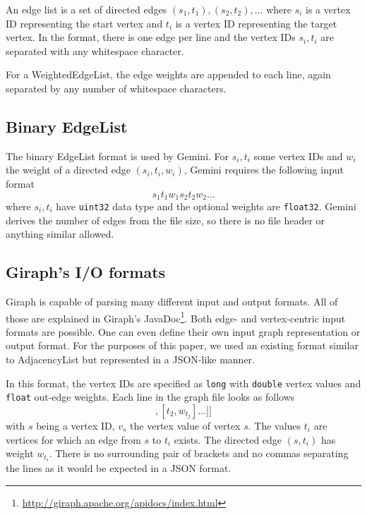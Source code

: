 An edge list is a set of directed edges $(s_1,t_1),(s_2,t_2),\ldots$ where $s_i$ is a vertex ID representing the start vertex and $t_i$ is a vertex ID representing the target vertex.
In the format, there is one edge per line and the vertex IDs $s_i, t_i$ are separated with any whitespace character.

For a WeightedEdgeList, the edge weights are appended to each line, again separated by any number of whitespace characters.

\subsection{Binary EdgeList}
The binary EdgeList format is used by Gemini.
For $s_i, t_i$ some vertex IDs and $w_i$ the weight of a directed edge $(s_i,t_i, w_i)$, Gemini requires the following input format
\begin{equation*}
	s_1t_1w_1s_2t_2w_2\ldots
\end{equation*}
where $s_i,t_i$ have \texttt{uint32} data type and the optional weights are \texttt{float32}.
Gemini derives the number of edges from the file size, so there is no file header or anything similar allowed.

\subsection{Giraph's I/O formats}
Giraph is capable of parsing many different input and output formats. All of those are explained in Giraph's JavaDoc\footnote{\url{http://giraph.apache.org/apidocs/index.html}}.
Both edge- and vertex-centric input formats are possible.
One can even define their own input graph representation or output format. For the purposes of this paper, we used an existing format similar to AdjacencyList but represented in a JSON-like manner.

In this format, the vertex IDs are specified as \texttt{long} with \texttt{double} vertex values and \texttt{float} out-edge weights.
Each line in the graph file looks as follows
\begin{equation*}
	[s,v_s,[[t_1, w_{t_1}], [t_2, w_{t_2}]...]]
\end{equation*}
with $s$ being a vertex ID, $v_s$ the vertex value of vertex $s$. The values $t_i$ are vertices for which an edge from $s$ to $t_i$ exists. The directed edge $(s,t_i)$ has weight $w_{t_i}$.
There is no surrounding pair of brackets and no commas separating the lines as it would be expected in a JSON format.
